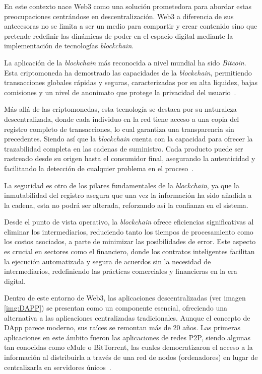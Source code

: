 En este contexto nace Web3 como una solución prometedora para abordar estas preocupaciones centrándose en descentralización. Web3 a diferencia de sus antecesoras no se limita a ser un medio para compartir y crear contenido sino que pretende redefinir las dinámicas de poder en el espacio digital mediante la implementación de tecnologías \textit{blockchain}.

La aplicación de la \textit{blockchain} más reconocida a nivel mundial ha sido \textit{Bitcoin}. Esta criptomoneda ha demostrado las capacidades de la \textit{blockchain}, permitiendo transacciones globales rápidas y seguras, caracterizadas por su alta liquidez, bajas comisiones y un nivel de anonimato que protege la privacidad del usuario~\cite{introducciónBitcoin}.

Más allá de las criptomonedas, esta tecnología se destaca por su naturaleza descentralizada, donde cada individuo en la red tiene acceso a una copia del registro completo de transacciones, lo cual garantiza una transparencia sin precedentes. Siendo así que la \textit{blockchain} cuenta con la capacidad para ofrecer la trazabilidad completa en las cadenas de suministro. Cada producto puede ser rastreado desde su origen hasta el consumidor final, asegurando la autenticidad y facilitando la detección de cualquier problema en el proceso~\cite{introducciónBlockchain}.

La seguridad es otro de los pilares fundamentales de la \textit{blockchain}, ya que la inmutabilidad del registro asegura que una vez la información ha sido añadida a la cadena, esta no podrá ser alterada, reforzando así la confianza en el sistema. 

Desde el punto de vista operativo, la \textit{blockchain} ofrece eficiencias significativas al eliminar los intermediarios, reduciendo tanto los tiempos de procesamiento como los costos asociados, a parte de minimizar las posibilidades de error.
Este aspecto es crucial en sectores como el financiero, donde los contratos inteligentes facilitan la ejecución automatizada y segura de acuerdos sin la necesidad de intermediarios, redefiniendo las prácticas comerciales y financieras en la era digital.

Dentro de este entorno de Web3, las aplicaciones descentralizadas (ver imagen \ref{img:DAPP}) se presentan como un componente esencial, ofreciendo una alternativa a las aplicaciones centralizadas tradicionales. 
Aunque el concepto de DApp parece moderno, sus raíces se remontan más de 20 años. Las primeras aplicaciones en este ámbito fueron las aplicaciones de redes P2P, siendo algunas tan conocidas como eMule o BitTorrent, las cuales democratizaron el acceso a la información al distribuirla a través de una red de nodos (ordenadores) en lugar de centralizarla en servidores únicos~\cite{DApps}.

